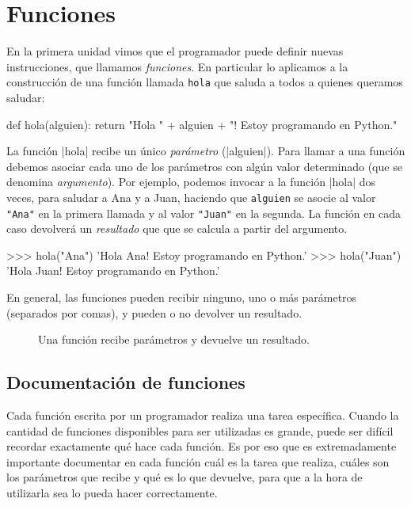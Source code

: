 \chapter[Funciones]{Funciones}
\label{chapter:funciones}

En la primera unidad vimos que el programador puede definir nuevas
instrucciones, que llamamos \emph{funciones}. En particular lo aplicamos a la
construcción de una función llamada \lstinline+hola+ que saluda a todos a
quienes queramos saludar:

\begin{codigo-python-sn}
def hola(alguien):
	return "Hola " + alguien + "! Estoy programando en Python."
\end{codigo-python-sn}

La función |hola| recibe un único \emph{parámetro} (|alguien|). Para llamar a
una función debemos asociar cada uno de los parámetros con algún valor
determinado (que se denomina \emph{argumento}). Por ejemplo, podemos invocar a
la función |hola| dos veces, para saludar a Ana y a Juan, haciendo que
\lstinline+alguien+ se asocie al valor \lstinline!"Ana"! en la primera llamada
y al valor \lstinline!"Juan"! en la segunda. La función en cada caso devolverá
un \emph{resultado} que que se calcula a partir del argumento.

\begin{codigo-python-sn}
>>> hola("Ana")
'Hola Ana! Estoy programando en Python.'
>>> hola("Juan")
'Hola Juan! Estoy programando en Python.'
\end{codigo-python-sn}

En general, las funciones pueden recibir ninguno, uno o más parámetros
(separados por comas), y pueden o no devolver un resultado.

\begin{figure}[ht]
\caption{Una función recibe parámetros y devuelve un resultado.}
\begin{center}

\end{center}
\end{figure}

\section{Documentación de funciones}

Cada función escrita por un programador realiza una tarea específica.  Cuando
la cantidad de funciones disponibles para ser utilizadas es grande, puede ser
difícil recordar exactamente qué hace cada función.  Es por eso que es
extremadamente importante documentar en cada función cuál es la tarea que
realiza, cuáles son los parámetros que recibe y qué es lo que devuelve, para
que a la hora de utilizarla sea lo pueda hacer correctamente.


